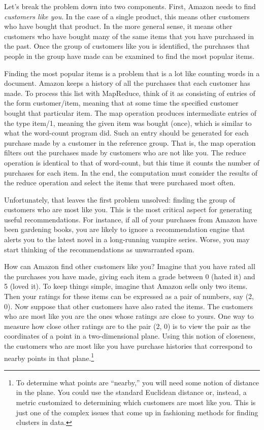 Let's break the problem down into
two components.  First, Amazon
needs to find \emph{customers like you}.
In the case of a single product, this means other customers who
have bought that product.  In the more general sense,
it means other customers who have bought many
of the same items that you have purchased in the past.
Once the group of
customers like you is identified, the purchases
that people in the group have made can be examined
to find the most popular items.

Finding the most popular items is a problem that is a lot like
counting words in a document.
Amazon keeps a history of all the purchases that each
customer has made.  To process this list with MapReduce, think of it as
consisting of entries of the form customer/item, meaning that at some time the specified
customer bought that particular item.
The map operation produces intermediate entries of the type item/1, meaning
the given item was bought (once),
which is similar to what the word-count program did.
Such an entry should be generated for
each purchase made by a customer in the reference group.  That is,
the map operation filters out the purchases made by customers who are
not like you. The reduce operation is identical to that of word-count,
but this time it counts the number of purchases for each item.
In the end, the computation must consider the results of the reduce operation
and select the items that were purchased most often.

Unfortunately, that leaves the first problem unsolved: finding the group of
customers who are most like you. This is the most critical aspect for
generating useful recommendations.  For instance, if all of your purchases
from Amazon have been gardening books, you are likely to ignore a
recommendation engine that alerts you to the latest novel in a long-running
vampire series.  Worse, you may start thinking of the recommendations
as unwarranted spam.

How can Amazon find other customers like you?  Imagine that
you have rated all the purchases you have made, giving each item a grade between
0 (hated it) and 5 (loved it).  To keep things simple, imagine that Amazon
sells only two items.  Then your ratings for these items can be expressed as
a pair of numbers, say (2, 0).  Now suppose that other customers have also
rated the items.  The customers who are most like you are the ones
whose ratings are close to yours.
One way to measure how close other ratings are to the pair (2, 0)
is to view the pair
as the coordinates of a point in a two-dimensional plane.
Using this notion of closeness, the customers who
are most like you have purchase histories that correspond to nearby
points in that plane.\footnote{To
determine what points are ``nearby,'' you will need
some notion of distance in the plane. You could use the standard
Euclidean distance or, instead, a metric customized
to determining which customers are most like you.
This is just one of the complex issues that come up
in fashioning methods for finding clusters in data.}

